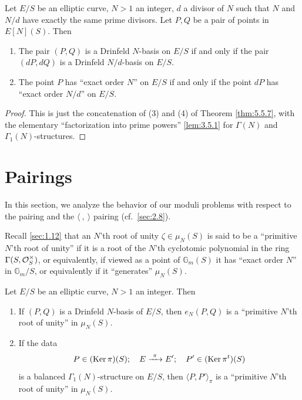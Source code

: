 \begin{kcor}\label{cor:5.5.8}
Let $E/S$ be an elliptic curve, $N > 1$ an integer, $d$ a divisor of $N$ such that $N$ and $N/d$ have exactly the same prime divisors. Let $P, Q$ be a pair of points in $E[N](S)$. Then
\begin{enumerate}[(1)]
\item The pair $(P, Q)$ is a Drinfeld $N$-basis on $E/S$ if and only if the pair $(dP, dQ)$ is a Drinfeld $N/d$-basis on $E/S$.
\item The point $P$ has ``exact order $N$'' on $E/S$ if and only if the point $dP$ has ``exact order $N/d$'' on $E/S$.
\end{enumerate}
\end{kcor}

\begin{proof}
This is just the concatenation of (3) and (4) of Theorem \ref{thm:5.5.7}, with the elementary ``factorization into prime powers'' \ref{lem:3.5.1} for $\Gamma(N)$ and $\Gamma_1(N)$-structures.
\end{proof}

\section{Pairings}
\label{sec:5.6}

\begin{pitem}\label{lem:5.6.1}
In this section, we analyze the behavior of our moduli problems with respect to the pairing and the $\langle\ ,\ \rangle$ pairing (cf.\ \ref{sec:2.8}).
\end{pitem}

\begin{pitem}\label{lem:5.6.2}
Recall \ref{sec:1.12} that an $N$'th root of unity $\zeta \in \mu_N(S)$ is said to be a ``primitive $N$'th root of unity'' if it is a root of the $N$'th cyclotomic polynomial in the ring $\Gamma(S, \mathcal{O}_S^\times)$, or equivalently, if viewed as a point of $\mathbb{G}_m(S)$ it has ``exact order $N$'' in $\mathbb{G}_m/S$, or equivalently if it ``generates'' $\mu_N(S)$.
\end{pitem}

\begin{kthm}\label{thm:5.6.3}
Let $E/S$ be an elliptic curve, $N > 1$ an integer. Then
\begin{enumerate}[(1)]
\item If $(P, Q)$ is a Drinfeld $N$-basis of $E/S$, then $e_N(P, Q)$ is a ``primitive $N$'th root of unity'' in $\mu_N(S)$.
\item If the data
\[
P \in (\operatorname{Ker} \pi)(S);\quad E \xrightarrow{\ \pi\ } E';\quad P' \in (\operatorname{Ker} \pi^t)(S)
\]
is a balanced $\Gamma_1(N)$-structure on $E/S$, then $\langle P, P'\rangle_\pi$ is a ``primitive $N$'th root of unity'' in $\mu_N(S)$.
\end{enumerate}
\end{kthm}

